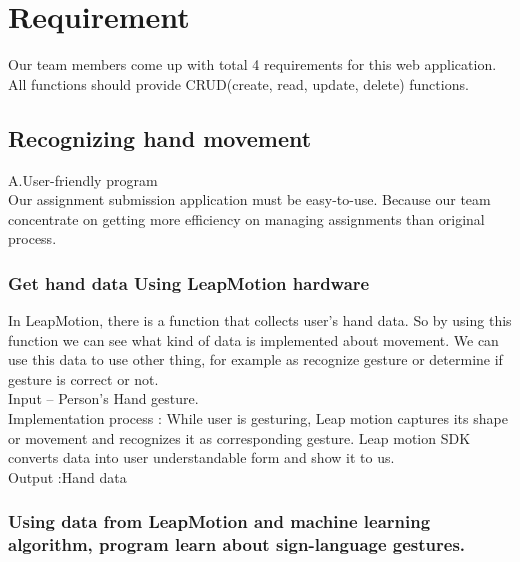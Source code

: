 \documentclass[10pt,journal,compsoc]{IEEEtran}
\begin{document}
\hfill 
 
\hfill 

\IEEEpeerreviewmaketitle

\ifCLASSOPTIONcompsoc
{}
\else
\section{Requirement}
\label{sec:Requirement}
\fi

Our team members come up with total 4 requirements for this web application. All functions should provide CRUD(create, read, update, delete) functions.

\subsection{Recognizing hand movement\\}
A.User-friendly program\\
Our assignment submission application must be easy-to-use. Because our team concentrate on getting more efficiency on managing assignments than original process. \\



\subsubsection{Get hand data Using LeapMotion hardware}

In LeapMotion, there is a function that collects user’s hand data. So by using this function we can see what kind of data is implemented about movement. 
We can use this data to use other thing, for example as recognize gesture or determine if gesture is correct or not.
\\Input – Person's Hand gesture.
\\Implementation process : While user is gesturing, Leap motion captures its shape or movement and recognizes it as corresponding gesture. Leap motion SDK converts data into user understandable form and show it to us.
\\Output :Hand data
\subsubsection{Using data from LeapMotion and machine learning algorithm, program learn about sign-language gestures.}
\end{document}
